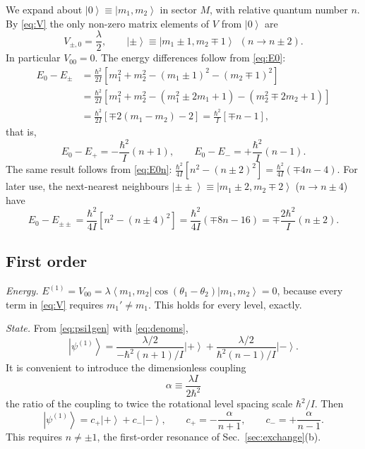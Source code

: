 \documentclass[preprint,12pt]{elsarticle}
\newcommand{\ket}[1]{\left|#1\right\rangle}
\newcommand{\bra}[1]{\left\langle#1\right|}
\begin{document}
We expand about $\ket{0}\equiv\ket{m_{1},m_{2}}$ in sector $M$, with relative
quantum number $n$. By \eqref{eq:V} the only non-zero matrix elements of $V$
from $\ket{0}$ are
\begin{equation}
V_{\pm,0}=\frac{\lambda}{2},\qquad
\ket{\pm}\equiv\ket{m_{1}\pm1,m_{2}\mp1}\ \ (n\to n\pm2).
\end{equation}
In particular $V_{00}=0$. The energy differences follow from \eqref{eq:E0}:
\begin{align}
E_{0}-E_{\pm}
&=\frac{\hbar^{2}}{2I}\left[m_{1}^{2}+m_{2}^{2}-(m_{1}\pm1)^{2}
-(m_{2}\mp1)^{2}\right]\nonumber\\
&=\frac{\hbar^{2}}{2I}\left[m_{1}^{2}+m_{2}^{2}
-\left(m_{1}^{2}\pm2m_{1}+1\right)-\left(m_{2}^{2}\mp2m_{2}+1\right)\right]
\nonumber\\
&=\frac{\hbar^{2}}{2I}\left[\mp2(m_{1}-m_{2})-2\right]
=\frac{\hbar^{2}}{I}\left[\mp n-1\right],
\end{align}
that is,
\begin{equation}
E_{0}-E_{+}=-\frac{\hbar^{2}}{I}(n+1),\qquad
E_{0}-E_{-}=+\frac{\hbar^{2}}{I}(n-1).
\label{eq:denoms}
\end{equation}
The same result follows from \eqref{eq:E0n}:
$\tfrac{\hbar^{2}}{4I}[n^{2}-(n\pm2)^{2}]=\tfrac{\hbar^{2}}{4I}(\mp4n-4)$.
For later use, the next-nearest neighbours $\ket{{\pm}{\pm}}\equiv
\ket{m_{1}\pm2,m_{2}\mp2}$ ($n\to n\pm4$) have
\begin{equation}
E_{0}-E_{\pm\pm}=\frac{\hbar^{2}}{4I}\left[n^{2}-(n\pm4)^{2}\right]
=\frac{\hbar^{2}}{4I}\left(\mp8n-16\right)
=\mp\frac{2\hbar^{2}}{I}(n\pm2).
\label{eq:denoms2}
\end{equation}

\subsection{First order}

\emph{Energy.} $E^{(1)}=V_{00}=\lambda\bra{m_{1},m_{2}}\cos(\theta_{1}-
\theta_{2})\ket{m_{1},m_{2}}=0$, because every term in \eqref{eq:V} requires
$m_{1}'\neq m_{1}$. This holds for every level, exactly.

\emph{State.} From \eqref{eq:psi1gen} with \eqref{eq:denoms},
\begin{equation}
\ket{\psi^{(1)}}=\frac{\lambda/2}{-\hbar^{2}(n+1)/I}\ket{+}
+\frac{\lambda/2}{\hbar^{2}(n-1)/I}\ket{-}.
\end{equation}
It is convenient to introduce the dimensionless coupling
\begin{equation}
\boxed{\;\alpha\equiv\frac{\lambda I}{2\hbar^{2}}\;}
\label{eq:alpha}
\end{equation}
the ratio of the coupling to twice the rotational level spacing scale
$\hbar^{2}/I$. Then
\begin{equation}
\ket{\psi^{(1)}}=c_{+}\ket{+}+c_{-}\ket{-},\qquad
c_{+}=-\frac{\alpha}{n+1},\qquad c_{-}=+\frac{\alpha}{n-1}.
\label{eq:first}
\end{equation}
This requires $n\neq\pm1$, the first-order resonance of
Sec.~\ref{sec:exchange}(b).
\end{document}
